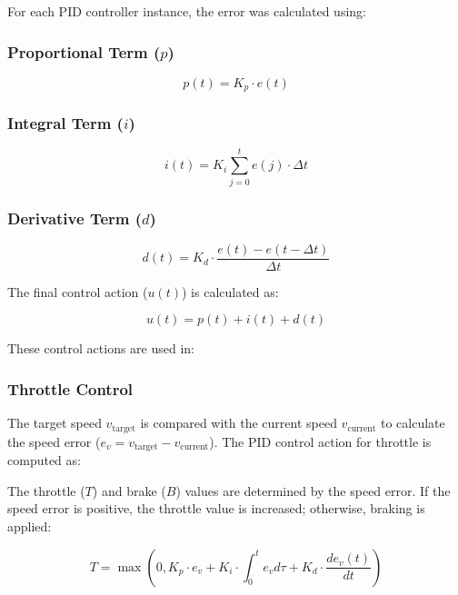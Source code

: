 \documentclass[conference]{IEEEtran}
\begin{document}
For each PID controller instance, the error was calculated using:

\subsubsection{Proportional Term ($p$)}

\begin{equation}
p(t) = K_p \cdot e(t)
\end{equation}

\subsubsection{Integral Term ($i$)}

\begin{equation}
i(t) = K_i \sum_{j=0}^{t} e(j) \cdot \Delta t
\end{equation}

\subsubsection{Derivative Term ($d$)}

\begin{equation}
d(t) = K_d \cdot \frac{e(t) - e(t-\Delta t)}{\Delta t}
\end{equation}

The final control action ($u(t)$) is calculated as:

\begin{equation}
u(t) = p(t) + i(t) + d(t)
\end{equation}

These control actions are used in:

\subsubsection{Throttle Control}
The target speed $v_{\text{target}}$ is compared with the current speed $v_{\text{current}}$ to calculate the speed error ($e_v = v_{\text{target}} - v_{\text{current}}$). The PID control action for throttle is computed as:

The throttle ($T$) and brake ($B$) values are determined by the speed error. If the speed error is positive, the throttle value is increased; otherwise, braking is applied:

\begin{equation}
T = \max(0, K_p \cdot e_v + K_i \cdot \int_{0}^{t} e_v d\tau + K_d \cdot \frac{de_v(t)}{dt})
\end{equation}
\end{document}
